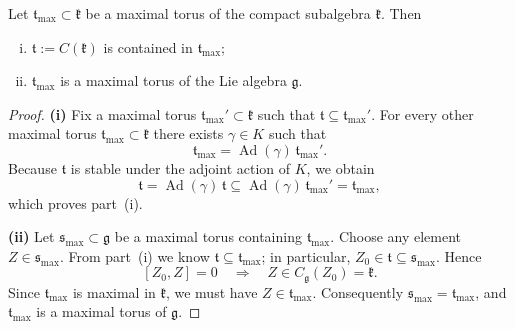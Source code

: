\documentclass[10pt,a4paper]{amsart}
\begin{document}
\begin{lem}\label{lemmaxtori}
Let \(\mathfrak t_{\max}\subset \mathfrak k\) be a maximal torus of the compact subalgebra \(\mathfrak k\). Then
\begin{enumerate}[(i)]
  \item  \(\mathfrak t:=C(\mathfrak k)\) is contained in \(\mathfrak t_{\max}\);
  \item \(\mathfrak t_{\max}\) is a maximal torus of the Lie algebra \(\mathfrak g\).
\end{enumerate}
\end{lem}

\begin{proof}
\textbf{(i)}\; Fix a maximal torus \(\mathfrak t_{\max}'\subset\mathfrak k\)
such that  $\mathfrak t\subseteq \mathfrak t_{\max}'$. For every other maximal torus \(\mathfrak t_{\max}\subset\mathfrak k\) there exists \(\gamma\in K\) such that 
\[
  \mathfrak t_{\max}=\operatorname{Ad}(\gamma)\,\mathfrak t_{\max}'.
\]
Because \(\mathfrak t\) is stable under the adjoint action of \(K\), we obtain
\[
  \mathfrak t=\operatorname{Ad}(\gamma)\,\mathfrak t\subseteq\operatorname{Ad}(\gamma)\,\mathfrak t_{\max}'=\mathfrak t_{\max},
\]
which proves part~(i).

\medskip
\noindent
\textbf{(ii)}\; Let \(\mathfrak s_{\max}\subset\mathfrak g\) be a maximal torus containing \(\mathfrak t_{\max}\). Choose any element \(Z\in\mathfrak s_{\max}\). From part~(i) we know \(\mathfrak t\subseteq\mathfrak t_{\max}\); in particular, \(Z_0\in\mathfrak t\subseteq\mathfrak s_{\max}\). Hence
\[
  [Z_0,Z]=0 \quad\Longrightarrow\quad Z\in C_{\mathfrak g}(Z_0)=\mathfrak k.
\]
Since \(\mathfrak t_{\max}\) is maximal in \(\mathfrak k\), we must have \(Z\in\mathfrak t_{\max}\). Consequently \(\mathfrak s_{\max}=\mathfrak t_{\max}\), and \(\mathfrak t_{\max}\) is a maximal torus of \(\mathfrak g\).
\end{proof}
\end{document}

